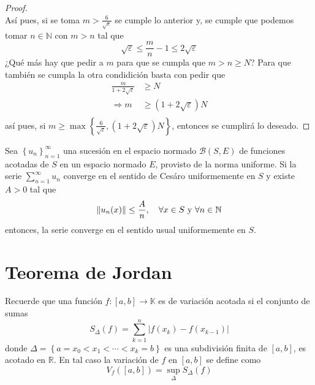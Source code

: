 \documentclass[12pt]{report}
\theoremstyle{largebreak}
\newcommand\abs[1]{\ensuremath{\left|#1\right|}}
\newcommand\cf[3]{\ensuremath{#1:#2\rightarrow#3}}
\newcommand\norm[1]{\ensuremath{\|#1\|}}
\begin{document}
\begin{proof}
\begin{equation*}
        \end{equation*}
        Así pues, si se toma $m>\frac{6}{\sqrt{\varepsilon}}$ se cumple lo anterior y, se cumple que podemos tomar $n\in\mathbb{N}$ con $m>n$ tal que
        \begin{equation*}
            \sqrt{\varepsilon}\leq\frac{m}{n}-1\leq2\sqrt{\varepsilon}
        \end{equation*}
        ¿Qué más hay que pedir a $m$ para que se cumpla que $m>n\geq N$? Para que también se cumpla la otra condidición basta con pedir que 
        \begin{equation*}
            \begin{split}
                \frac{m}{1+2\sqrt{\varepsilon}}&\geq N\\
                \Rightarrow m&\geq(1+2\sqrt{\varepsilon})N\\
            \end{split}
        \end{equation*}
        así pues, si $m\geq\max\left\{\frac{6}{\sqrt{\varepsilon}},(1+2\sqrt{\varepsilon})N \right\}$, entonces se cumplirá lo deseado.
    \end{proof}

    \begin{cor}
        Sea $\left\{u_n \right\}_{ n=1}^\infty$ una sucesión en el espacio normado $\mathcal{B}(S,E)$ de funciones acotadas de $S$ en un espacio normado $E$, provisto de la norma uniforme. Si la serie $\sum_{ n=1}^\infty u_n$ converge en el sentido de Cesáro uniformemente en $S$ y existe $A>0$ tal que
        \begin{equation*}
            \norm{u_n(x)}\leq\frac{A}{n},\quad\forall x\in S \textup{ y }\forall n\in\mathbb{N}
        \end{equation*}
        entonces, la serie converge en el sentido usual uniformemente en $S$.
    \end{cor}

    \section{Teorema de Jordan}

    Recuerde que una función $\cf{f}{[a,b]}{\mathbb{K}}$ es de variación acotada si el conjunto de sumas
    \begin{equation*}
        S_\Delta(f)=\sum_{ k=1}^n\abs{f(x_k)-f(x_{ k-1})}
    \end{equation*}
    donde $\Delta=\left\{a=x_0<x_1<\cdots<x_k=b \right\}$ es una subdivisión finita de $[a,b]$, es acotado en $\mathbb{R}$. En tal caso la variación de $f$ en $[a,b]$ se define como
    \begin{equation*}
        V_f([a,b])=\sup_{\Delta}S_\Delta(f)
    \end{equation*}
\end{document}
